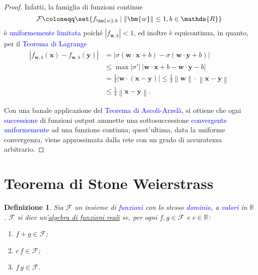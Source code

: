 \documentclass[10pt]{book}
\newcommand{\1}{\mathds{1}}
\newcommand{\R}{\mathds{R}}
\newcommand{\norma}[1]{%
\left\lVert#1\right\rVert%
}
\theoremstyle{definition}%
\theoremstyle{plain}
\newtheorem{definizione}[thm]{Definizione}
\theoremstyle{remark}
\renewcommand{\href}[2]{\textcolor{blue}{#2}}
\begin{document}
\begin{proof}
Infatti, la famiglia di funzioni continue
\begin{equation*}
\mathcal{F} \coloneqq \set{f_{\bm{w},b}\mid \norma{\bm{w}}\le 1, b \in \R}
\end{equation*}
è \href{../../../../../org/roam/20250629110306-funzioni_uniformemente_limitate.org}{uniformemente limitata} poiché \(|f_{\bm{w},b}|< 1\), ed inoltre è equicontinua, in quanto, per il \href{../../../../../org/roam/20250629143200-teorema_di_lagrange.org}{Teorema di Lagrange}
\begin{align*}
|f_{\bm{w},b}(\bm{x})-f_{\bm{w},b}(\bm{y}) | &= \big\lvert \sigma(\bm{w}\cdot\bm{x} + b) - \sigma(\bm{w}\cdot\bm{y} + b)\big\rvert\\
&\le \max|\sigma'|\ |\bm{w}\cdot\bm{x} + b - \bm{w}\cdot\bm{y} - b|\\
&= \frac{1}{4} |\bm{w}\cdot(\bm{x}-\bm{y})| \le \frac{1}{4} \norma{\bm{w}}\cdot \norma{\bm{x}-\bm{y}} \\
&\le \frac{1}{4}\norma{\bm{x}-\bm{y}}.
\end{align*}

Con una banale applicazione del \href{../../../../../org/roam/20250629120441-teorema_di_ascoli_arzela.org}{Teorema di Ascoli-Arzelà}, si ottiene che ogni \href{../../../../../org/roam/20250629105815-successione_di_funzioni.org}{successione} di funzioni output ammette una sottosuccessione \href{../../../../../org/roam/20250629105745-convergenza_uniforme.org}{convergente uniformemente} ad una funzione continua; quest'ultima, data la uniforme convergenza, viene approssimata dalla rete con un grado di accuratezza arbitrario.
\end{proof}
\section{Teorema di Stone Weierstrass}
\label{sec:orgea6ad5e}

\begin{definizione}
Sia \(\mathcal{F}\) un insieme di \href{../../../../../org/roam/20250202170607-classe_relazione_binaria.org}{funzioni} con lo stesso \href{../../../../../org/roam/20250202173528-dominio_range_e_campo_di_una_classe_relazione.org}{dominio}, a \href{../../../../../org/roam/20250202173528-dominio_range_e_campo_di_una_classe_relazione.org}{valori} in \(\R\). \(\mathcal{F}\) si dice un'\uline{algebra di funzioni reali} se, per ogni \(f,g \in \mathcal{F}\) e \(c \in \R\):
\begin{enumerate}
\item \(f+g \in \mathcal{F}\);
\item \(c\,f \in \mathcal{F}\);
\item \(f\,g \in \mathcal{F}\).
\end{enumerate}
\end{definizione}
\end{document}
